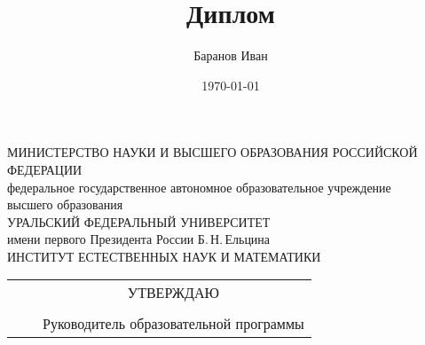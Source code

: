 \documentclass[a4paper,14pt]{extarticle}
\author{Баранов Иван}
\title{Диплом}
\date{\today}
\theoremstyle{plain} %
\theoremstyle{definition} %
\theoremstyle{remark} %
\begin{document}
\begin{titlepage}
	\centering
	МИНИСТЕРСТВО НАУКИ И ВЫСШЕГО ОБРАЗОВАНИЯ РОССИЙСКОЙ\\
	ФЕДЕРАЦИИ\\
	федеральное государственное автономное образовательное учреждение\\
	высшего образования\\
	УРАЛЬСКИЙ ФЕДЕРАЛЬНЫЙ УНИВЕРСИТЕТ\\
	имени первого Президента России Б.\,Н.\,Ельцина\\
	\vspace{1cm}
	ИНСТИТУТ ЕСТЕСТВЕННЫХ НАУК И МАТЕМАТИКИ\\
	\vspace{2cm}

	\begin{tabular}{ccc}
		\hspace{3cm} & \hspace{3cm} & УТВЕРЖДАЮ\\
		\hspace{3cm} & \hspace{3cm} &\hspace{3cm}\\
		\hspace{3cm} & \hspace{3cm} & Руководитель образовательной программы
	\end{tabular}
\end{titlepage}
\end{document}
